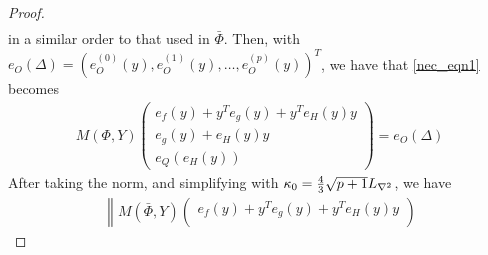 \begin{proof}
\begin{align*}
\end{align*}
in a similar order to that used in $\bar \Phi$.
Then, with $e_O\left(\Delta\right) = \left(
e^{(0)}_O\left(y\right),
e^{(1)}_O\left(y\right),
\ldots ,
e^{(p)}_O\left(y\right)
\right)^T$,
we have that \cref{nec_eqn1} becomes
\begin{align*}
M\left(\Phi, Y\right)
\begin{pmatrix}
e_f(y) + y^Te_g(y) + y^Te_H(y) y \\
e_g(y) + e_H(y) y \\
e_Q\left(e_H(y)\right)
\end{pmatrix}
= e_O\left(\Delta\right)
\end{align*}
After taking the norm, and simplifying with $\kappa_0 = \frac 4 3 \sqrt{p+1}{L_{\nabla^2}}$, we have
\begin{align*}
\left\|M(\bar \Phi,Y)
\begin{pmatrix}
e_f(y) + y^Te_g(y) + y^Te_H(y) y \\

\end{pmatrix}
\end{align*}
\end{proof}
